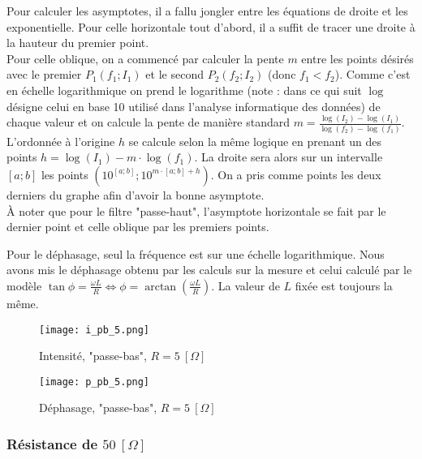 \begin{invsummary}
Pour calculer les asymptotes, il a fallu jongler entre les équations de droite et les exponentielle. Pour celle horizontale tout d'abord, il a suffit de tracer une droite à la hauteur du premier point.\\
Pour celle oblique, on a commencé par calculer la pente $m$ entre les points désirés avec le premier $P_1(f_1;I_1)$ et le second $P_2(f_2;I_2)$ (donc $f_1 < f_2$). Comme c'est en échelle logarithmique on prend le logarithme (note : dans ce qui suit $\log$ désigne celui en base 10 utilisé dans l'analyse informatique des données) de chaque valeur et on calcule la pente de manière standard $m = \frac{\log (I_2) - \log (I_1)}{\log (f_2) - \log (f_1)}$. L'ordonnée à l'origine $h$ se calcule selon la même logique en prenant un des points $h = \log (I_1) - m \cdot \log (f_1)$. La droite sera alors sur un intervalle $[a;b]$ les points $(10^{[a;b]};10^{m \cdot [a;b] + h})$. On a pris comme points les deux derniers du graphe afin d'avoir la bonne asymptote.\\
À noter que pour le filtre "passe-haut", l'asymptote horizontale se fait par le dernier point et celle oblique par les premiers points.
\end{invsummary}
Pour le déphasage, seul la fréquence est sur une échelle logarithmique. Nous avons mis le déphasage obtenu par les calculs sur la mesure et celui calculé par le modèle $\tan \phi = \frac{\omega L}{R} \Leftrightarrow \phi = \arctan \left( \frac{\omega L}{R} \right)$. La valeur de $L$ fixée est toujours la même.

\begin{minipage}{.5\textwidth}
\begin{figure}[H]
\centering
\texttt{[image: i\_pb\_5.png]}
\caption{Intensité, "passe-bas", $R = 5 \ [ \Omega ]$}
\end{figure}
\end{minipage}
\begin{minipage}{.5\textwidth}
\begin{figure}[H]
\centering
\texttt{[image: p\_pb\_5.png]}
\caption{Déphasage, "passe-bas", $R = 5 \ [ \Omega ]$}
\end{figure}
\end{minipage}

\subsubsection{Résistance de \texorpdfstring{$ 50 \ [ \Omega ] $}{TEXT}}

